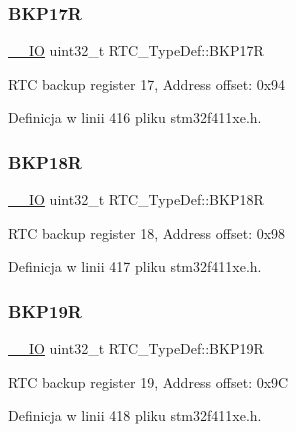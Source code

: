 \subsubsection{\texorpdfstring{B\+K\+P17R}{BKP17R}}
{\footnotesize\ttfamily \hyperlink{core__sc300_8h_aec43007d9998a0a0e01faede4133d6be}{\+\_\+\+\_\+\+IO} uint32\+\_\+t R\+T\+C\+\_\+\+Type\+Def\+::\+B\+K\+P17R}

R\+TC backup register 17, Address offset\+: 0x94 

Definicja w linii 416 pliku stm32f411xe.\+h.

\mbox{\label{struct_r_t_c___type_def_a171288f82cab2623832de779fb435d74}} 
\subsubsection{\texorpdfstring{B\+K\+P18R}{BKP18R}}
{\footnotesize\ttfamily \hyperlink{core__sc300_8h_aec43007d9998a0a0e01faede4133d6be}{\+\_\+\+\_\+\+IO} uint32\+\_\+t R\+T\+C\+\_\+\+Type\+Def\+::\+B\+K\+P18R}

R\+TC backup register 18, Address offset\+: 0x98 

Definicja w linii 417 pliku stm32f411xe.\+h.

\mbox{\label{struct_r_t_c___type_def_a993f54e8feff9254f795dfd3e000fc55}} 
\subsubsection{\texorpdfstring{B\+K\+P19R}{BKP19R}}
{\footnotesize\ttfamily \hyperlink{core__sc300_8h_aec43007d9998a0a0e01faede4133d6be}{\+\_\+\+\_\+\+IO} uint32\+\_\+t R\+T\+C\+\_\+\+Type\+Def\+::\+B\+K\+P19R}

R\+TC backup register 19, Address offset\+: 0x9C 

Definicja w linii 418 pliku stm32f411xe.\+h.

\mbox{\label{struct_r_t_c___type_def_a5439bfca3708c6b8be6a74626f06111f}} 
